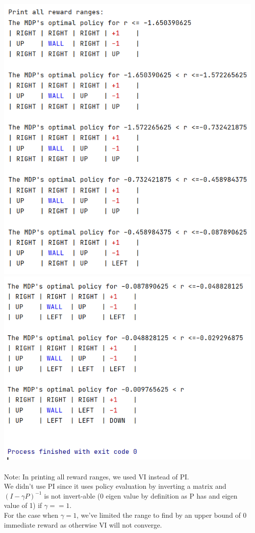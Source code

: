 \documentclass[12pt]{article}
\begin{document}
\includegraphics[scale=0.6]{hw3/plots/r1.PNG}
\includegraphics[scale=0.6]{hw3/plots/r2.PNG}\\
\\
Note: In printing all reward ranges, we used VI instead of PI.\\
We didn't use PI since it uses policy evaluation by inverting a matrix and $(I-\gamma P)^{-1}$ is not invert-able (0 eigen value by definition as P has and eigen value of 1) if $\gamma == 1$.\\
For the case when $\gamma=1$, we've limited the range to find by an upper bound of 0 immediate reward as otherwise VI will not converge.
\newpage
\end{document}
